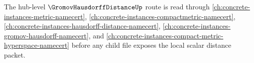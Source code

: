 The hub-level $\GromovHausdorffDistanceUp$ route is read through \autoref{ch:concrete-instances-metric-namecert}, \autoref{ch:concrete-instances-compactmetric-namecert}, \autoref{ch:concrete-instances-hausdorff-distance-namecert}, \autoref{ch:concrete-instances-gromov-hausdorff-namecert}, and \autoref{ch:concrete-instances-compact-metric-hyperspace-namecert} before any child file exposes the local scalar distance packet.
